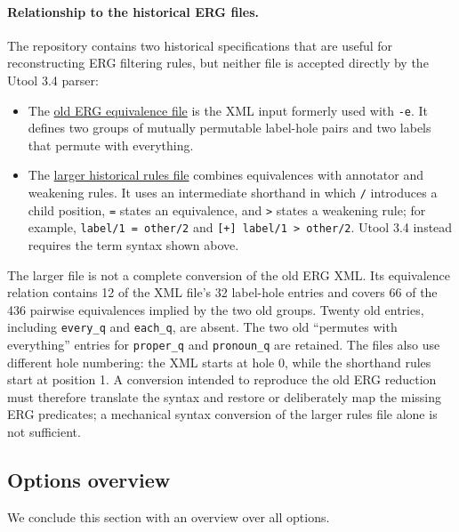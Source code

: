 \paragraph{Relationship to the historical ERG files.}
The repository contains two historical specifications that are useful
for reconstructing ERG filtering rules, but neither file is accepted
directly by the Utool 3.4 parser:

\begin{itemize}
\raggedright
\item The
\href{https://github.com/coli-saar/utool/blob/master/src/main/resources/examples/erg-equivalences.xml}{old ERG equivalence file}
is the XML input formerly used with \verb?-e?. It defines two groups
of mutually permutable label-hole pairs and two labels that permute
with everything.

\item The
\href{https://github.com/coli-saar/utool/blob/master/testsuites/rewriting-10/rules}{larger historical rules file}
combines equivalences with annotator and weakening rules. It uses an
intermediate shorthand in which \verb?/? introduces a child position,
\verb?=? states an equivalence, and \verb?>? states a weakening rule;
for example, \verb?label/1 = other/2? and
\verb?[+] label/1 > other/2?. Utool 3.4 instead requires the term
syntax shown above.
\end{itemize}

The larger file is not a complete conversion of the old ERG XML. Its
equivalence relation contains 12 of the XML file's 32 label-hole
entries and covers 66 of the 436 pairwise equivalences implied by the
two old groups. Twenty old entries, including \verb?every_q? and
\verb?each_q?, are absent. The two old ``permutes with everything''
entries for \verb?proper_q? and \verb?pronoun_q? are retained. The
files also use different hole numbering: the XML starts at hole 0,
while the shorthand rules start at position 1. A conversion intended
to reproduce the old ERG reduction must therefore translate the
syntax and restore or deliberately map the missing ERG predicates; a
mechanical syntax conversion of the larger rules file alone is not
sufficient.




\subsection{Options overview}

We conclude this section with an overview over all options.

